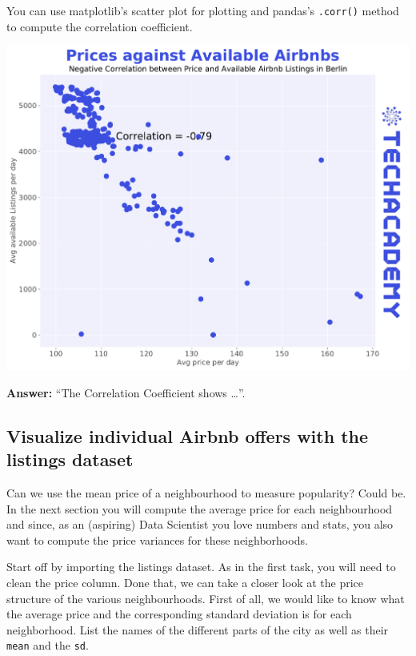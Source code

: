 \documentclass[
  11pt,
]{article}
\newenvironment{tipsp}[1]
  {
  \begin{itemize}
  \footnotesize
  \renewcommand{\labelitemi}{
    \raisebox{-.7\height}[0pt][0pt]{
      {\setkeys{Gin}{width=3em,keepaspectratio}
        \texttt{[image: images/\#1.png]}}
    }
  }
  \setlength{\fboxsep}{1em}
  \begin{pbox}
  \item
  }
  {
  \end{pbox}
  \end{itemize}
  }
\begin{document}
\begin{tipsp}p
You can use matplotlib's scatter plot for plotting and pandas's \texttt{.corr()} method to compute the correlation coefficient.

\end{tipsp}

\begin{center}\includegraphics[width=1\linewidth]{plot/01_python/corr_availability_price} \end{center}

\textbf{Answer:} ``The Correlation Coefficient shows \ldots{}''.

\hypertarget{visualize-individual-airbnb-offers-with-the-listings-dataset}{%
\subsection{Visualize individual Airbnb offers with the listings dataset}\label{visualize-individual-airbnb-offers-with-the-listings-dataset}}

Can we use the mean price of a neighbourhood to measure popularity? Could be. In the next section you will compute the average price for each neighbourhood and since, as an (aspiring) Data Scientist you love numbers and stats, you also want to compute the price variances for these neighborhoods.

Start off by importing the listings dataset. As in the first task, you will need to clean the price column. Done that, we can take a closer look at the price structure of the various neighbourhoods. First of all, we would like to know what the average price and the corresponding standard deviation is for each neighborhood. List the names of the different parts of the city as well as their \texttt{mean} and the \texttt{sd}.
\end{document}
